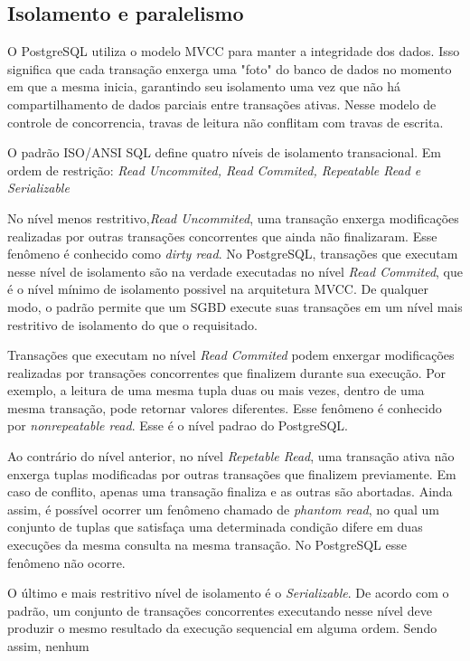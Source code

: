 \documentclass[conference]{IEEEtran}
\begin{document}
\subsection{Isolamento e paralelismo}
O PostgreSQL utiliza o modelo MVCC para manter a integridade dos dados. Isso significa que cada transação enxerga uma "foto"
do banco de dados no momento em que a mesma inicia, garantindo seu isolamento uma vez que não há compartilhamento de dados
parciais entre transações ativas. Nesse modelo de controle de concorrencia, travas de leitura não conflitam com travas de escrita.
\par O padrão ISO/ANSI SQL define quatro níveis de isolamento transacional. Em ordem de restrição: \emph{
Read Uncommited, Read Commited, Repeatable Read e Serializable}
\par No nível menos restritivo,\emph{Read Uncommited}, uma transação enxerga modificações realizadas por outras transações
concorrentes que ainda não finalizaram. Esse fenômeno é conhecido como \emph{dirty read}. No PostgreSQL, transações que executam
nesse nível de isolamento são na verdade executadas no nível \emph{Read Commited}, que é o nível mínimo de isolamento possivel
na arquitetura MVCC. De qualquer modo, o padrão permite que um SGBD execute suas transações em um nível mais restritivo
de isolamento do que o requisitado.
\par Transações que executam no nível \emph{Read Commited} podem enxergar modificações realizadas por transações concorrentes
que finalizem durante sua execução. Por exemplo, a leitura de uma mesma tupla duas ou mais vezes, dentro de uma mesma transação,
pode retornar valores diferentes. Esse fenômeno é conhecido por \emph{nonrepeatable read}. Esse é o nível padrao do PostgreSQL.
\par Ao contrário do nível anterior, no nível \emph{Repetable Read}, uma transação ativa não enxerga tuplas modificadas
por outras transações que finalizem previamente. Em caso de conflito, apenas uma transação finaliza e as outras são abortadas.
Ainda assim, é possível ocorrer um fenômeno chamado de \emph{phantom read}, no qual um conjunto de tuplas que satisfaça uma
determinada condição difere em duas execuções da mesma consulta na mesma transação. No PostgreSQL esse fenômeno não ocorre.
\par O último e mais restritivo nível de isolamento é o \emph{Serializable}. De acordo com o padrão, um conjunto de transações
concorrentes executando nesse nível deve produzir o mesmo resultado da execução sequencial em alguma ordem. Sendo assim, nenhum
\end{document}
